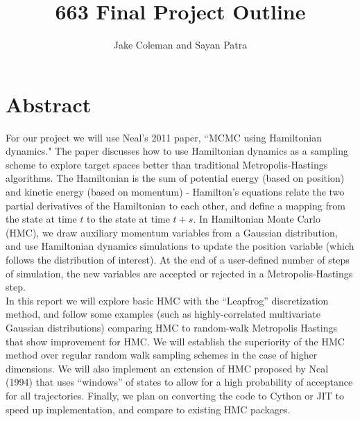 \documentclass{article}
\title{663 Final Project Outline}
\author{Jake Coleman and Sayan Patra}
\date{}
\begin{document}
\maketitle

\section{Abstract}
For our project we will use Neal's 2011 paper, ``MCMC using Hamiltonian dynamics." The paper discusses how to use Hamiltonian dynamics as a sampling scheme to explore target spaces better than traditional Metropolis-Hastings algorithms. The Hamiltonian is the sum of potential energy (based on position) and kinetic energy (based on momentum) - Hamilton's equations relate the two partial derivatives of the Hamiltonian to each other, and define a mapping from the state at time $t$ to the state at time $t + s$. In Hamiltonian Monte Carlo (HMC), we draw auxiliary momentum variables from a Gaussian distribution, and use Hamiltonian dynamics simulations to update the position variable (which follows the distribution of interest). At the end of a user-defined number of steps of simulation, the new variables are accepted or rejected in a Metropolis-Hastings step.\\

In this report we will explore basic HMC with the ``Leapfrog'' discretization method, and follow some examples (such as highly-correlated multivariate Gaussian distributions) comparing HMC to random-walk Metropolis Hastings that show improvement for HMC. We will establish the superiority of the HMC method over regular random walk sampling schemes in the case of higher dimensions. We will also implement an extension of HMC proposed by Neal (1994) that uses ``windows'' of states to allow for a high probability of acceptance for all trajectories. Finally, we plan on converting the code to Cython or JIT to speed up implementation, and compare to existing HMC packages.
\end{document}
